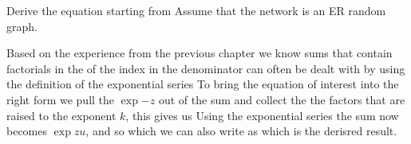 
Derive the equation
starting from 
Assume that the network is an ER random graph. 

\solution
Based on the experience from the previous chapter we know sums that contain factorials in the of the index in the denominator can often be dealt with by using the definition of the exponential series
To bring the equation of interest into the right form we pull the $\exp{-z}$ out of the sum and collect the the factors that are raised to the exponent $k$, this gives us 
Using the exponential series the sum now becomes $\exp{zu}$, and so
which we can also write as 
which is the derisred result.

